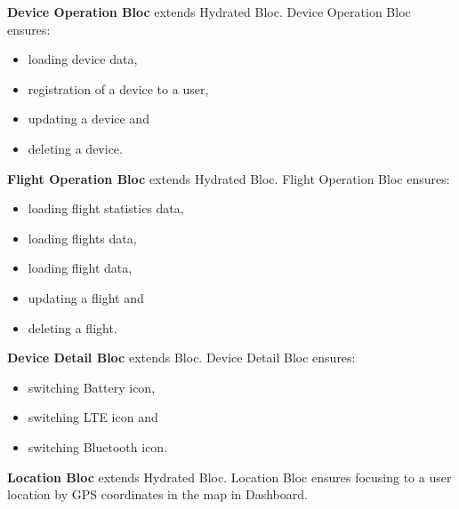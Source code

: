 \textbf{Device Operation Bloc} extends Hydrated Bloc.
Device Operation Bloc ensures:
\begin{itemize}
    \item loading device data,
    \item registration of a device to a user,
    \item updating a device and
    \item deleting a device.
\end{itemize}

\textbf{Flight Operation Bloc} extends Hydrated Bloc.
Flight Operation Bloc ensures:
\begin{itemize}
    \item loading flight statistics data,
    \item loading flights data,
    \item loading flight data,
    \item updating a flight and
    \item deleting a flight.
\end{itemize}

\textbf{Device Detail Bloc} extends Bloc.
Device Detail Bloc ensures:
\begin{itemize}
    \item switching Battery icon,
    \item switching LTE icon and
    \item switching Bluetooth icon.
\end{itemize}

\textbf{Location Bloc} extends Hydrated Bloc.
Location Bloc ensures focusing to a user location by GPS coordinates in the map in Dashboard.

